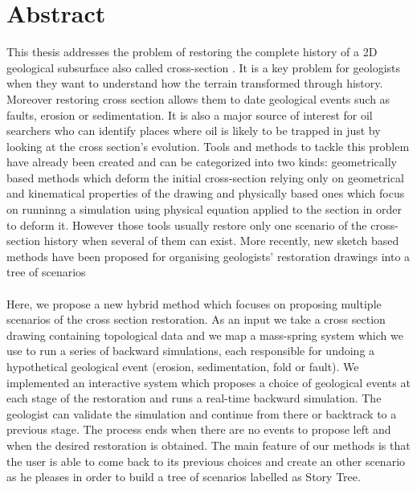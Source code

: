 \documentclass[12pt, a4paper]{report} %
\begin{document}



\chapter*{Abstract}

This thesis addresses the problem of restoring the complete history of a 2D geological 
subsurface also called cross-section \cite{BalancedCrossSections}. It is a key problem for geologists when they want to understand how the terrain transformed through history. Moreover restoring cross section allows them to date geological events such as faults, erosion or sedimentation. It is also a major source of interest for oil searchers who can identify places where oil is likely to be trapped in just by looking at the cross section's evolution. Tools and methods to tackle this problem have already been created and can  be categorized into two kinds: geometrically based methods which deform the initial cross-section relying only on geometrical and kinematical properties of the drawing and physically based ones which focus on runninng a simulation using physical equation applied to the section in order to deform it. However those tools usually restore only one scenario of the cross-section history when several of them can exist. More recently, new sketch based methods have been proposed for organising geologists' restoration drawings into a tree of scenarios\\\\
 Here, we propose a new hybrid method which focuses on proposing multiple scenarios of the cross section restoration. As an input we take a cross section drawing containing topological data and we map a mass-spring system which we use to run a series of backward simulations, each responsible for undoing a hypothetical geological event (erosion, sedimentation, fold or fault). We implemented an interactive system which proposes a choice of geological events
at each stage of the restoration and runs a real-time backward simulation. The geologist can validate the simulation and continue from there or backtrack to a previous stage. The process ends when there are no events to propose left and when the desired restoration is obtained. The main feature of our methods is that the user is able to come back to its previous choices and create an other scenario as he pleases in order to build a tree of scenarios labelled as Story Tree.\\\\
\newpage
\end{document}
